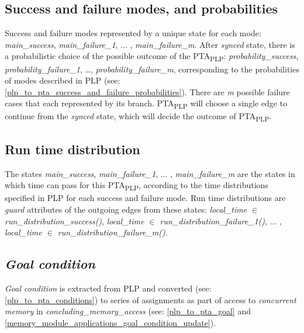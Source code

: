 \subsection{Success and failure modes, and probabilities \label{pta_achieve_success_failures_probabilities}}
Success and failure modes represented by a unique state for each mode: \textcolor{ColorUppaalState}{\textit{main_success}}, \textcolor{ColorUppaalState}{\textit{main_failure_1}}, ... , \textcolor{ColorUppaalState}{\textit{main_failure_m}}. After \textcolor{ColorUppaalState}{\textit{synced}} state, there is a probabilistic choice of the possible outcome of the PTA\textsubscript{PLP}: \textcolor{ColorEdgeProbability}{\textit{probability_success}}, \textcolor{ColorEdgeProbability}{\textit{probability_failure_1}}, …, \textcolor{ColorEdgeProbability}{\textit{probability_failure_m}}, corresponding to the probabilities of modes described in PLP (see: \ref{plp_to_pta_success_and_failure_probabilities}). There are \textit{m} possible failure cases that each represented by its branch. PTA\textsubscript{PLP} will choose a single edge to continue from the \textcolor{ColorUppaalState}{\textit{synced}} state, which will decide the outcome of PTA\textsubscript{PLP}.\\
\subsection{Run time distribution \label{pta_achieve_run_time_distribution}}
The states \textcolor{ColorUppaalState}{\textit{main_success}}, \textcolor{ColorUppaalState}{\textit{main_failure_1}}, ... , \textcolor{ColorUppaalState}{\textit{main_failure_m}} are the states in which time can pass for this PTA\textsubscript{PLP}, according to the time distributions specified in PLP for each success and failure mode. Run time distributions are \textit{guard} attributes of the outgoing edges from these states: \textcolor{ColorEdgeGuard}{\textit{local_time $\in$ run_distribution_success()}}, \textcolor{ColorEdgeGuard}{\textit{local_time $\in$ run_distribution_failure_1()}}, ... , \textcolor{ColorEdgeGuard}{\textit{local_time $\in$ run_distribution_failure_m()}}.\\
\subsection{\textit{\textit{Goal condition}}}
\textit{\textit{Goal condition}} is extracted from PLP and converted (see: \ref{plp_to_pta_conditions}) to series of assignments as part of access to \textit{concurrent memory} in \textcolor{ColorUppaalState}{\textit{concluding_memory_access}} (see: \ref{plp_to_pta_goal} and \ref{memory_module_applications_goal_condition_update}). \\
